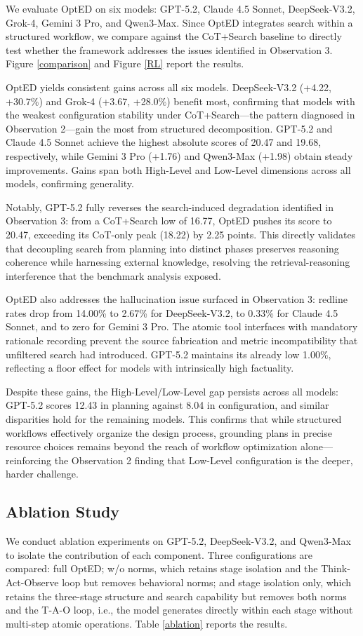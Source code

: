\documentclass[letterpaper]{article} %
\begin{document}
We evaluate OptED on six models: GPT-5.2, Claude 4.5 Sonnet, DeepSeek-V3.2, Grok-4, Gemini 3 Pro, and Qwen3-Max.
Since OptED integrates search within a structured workflow, we compare against the CoT+Search baseline to directly test whether the 
framework addresses the issues identified in Observation 3. Figure \ref{comparison} and Figure \ref{RL} report the results.

OptED yields consistent gains across all six models. DeepSeek-V3.2 (+4.22, +30.7\%) and Grok-4 (+3.67, +28.0\%) benefit most, confirming that models with the weakest configuration stability under CoT+Search---the pattern diagnosed in Observation 2---gain the most from structured decomposition. GPT-5.2 and Claude 4.5 Sonnet achieve the highest absolute scores of 20.47 and 19.68, respectively, while Gemini 3 Pro (+1.76) and Qwen3-Max (+1.98) obtain steady improvements. Gains span both High-Level and Low-Level dimensions across all models, confirming generality.

Notably, GPT-5.2 fully reverses the search-induced degradation identified in Observation 3: from a CoT+Search low of 16.77, OptED pushes its score to 20.47, exceeding its CoT-only peak (18.22) by 2.25 points. This directly validates that decoupling search from planning into distinct phases preserves reasoning coherence while harnessing external knowledge, resolving the retrieval-reasoning interference that the benchmark analysis exposed.

OptED also addresses the hallucination issue surfaced in Observation 3: redline rates drop from 14.00\%
to 2.67\% for DeepSeek-V3.2, to 0.33\% for Claude 4.5 Sonnet, and to zero for Gemini 3 Pro. The atomic tool interfaces with mandatory rationale recording prevent the source fabrication and metric incompatibility that unfiltered search had introduced. GPT-5.2 maintains its already low 1.00\%, reflecting a floor effect for models with intrinsically high factuality.

Despite these gains, the High-Level/Low-Level gap persists across all models: GPT-5.2 scores 12.43 in planning against 8.04 in configuration, and similar disparities hold for the remaining models. This confirms that while structured workflows effectively organize the design process, grounding plans in precise resource choices remains beyond the reach of workflow optimization alone---reinforcing the Observation 2 finding that Low-Level configuration is the deeper, harder challenge.

\subsection{Ablation Study}
We conduct ablation experiments on GPT-5.2, DeepSeek-V3.2, and Qwen3-Max to isolate the contribution of each component. 
Three configurations are compared: full OptED; w/o norms, which retains stage isolation and the Think-Act-Observe loop 
but removes behavioral norms; and stage isolation only, which retains the three-stage structure and search capability but 
removes both norms and the T-A-O loop, i.e., the model generates directly within each stage without multi-step atomic operations. Table \ref{ablation} reports the results.
\end{document}
